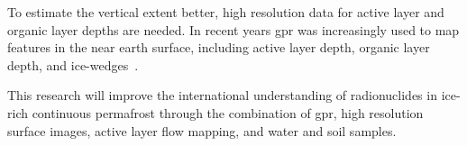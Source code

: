 To estimate the vertical extent better, high resolution data for active layer and organic layer depths are needed. 
In recent years \gls{gpr} was increasingly used to map features in the near earth surface, including active layer depth, organic layer depth, and ice-wedges~\citep{angelopoulosApplicationCCRGPR2013, guoDetectionPermafrostSubgrade2015, harrisUsingGroundPenetratingRadar2025, hinkelDetectionSubsurfacePermafrost2001, koyanPotential3DGPR2025, sudakovaUsingGroundPenetrating2021, sudakovaGroundPenetratingRadarStudies2019}.

This research will improve the international understanding of radionuclides in ice-rich continuous permafrost through the combination of \gls{gpr}, high resolution surface images, active layer flow mapping, and water and soil samples. 

